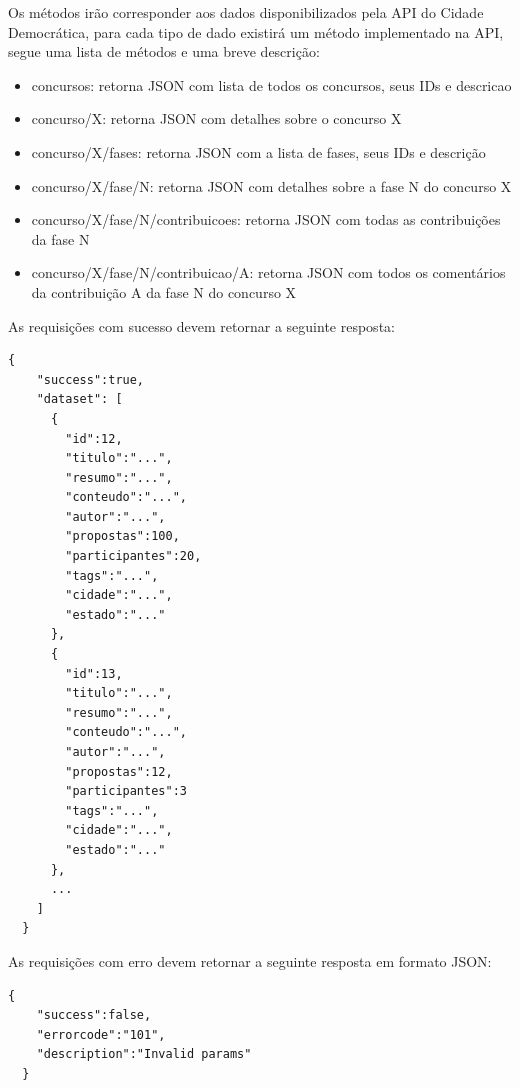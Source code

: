 \documentclass[12pt]{article}
\begin{document}
Os métodos irão corresponder aos dados disponibilizados pela API do Cidade
Democrática, para cada tipo de dado existirá um método implementado na API,
segue uma lista de métodos e uma breve descrição:

\begin{itemize}
  \item concursos: retorna JSON com lista de todos os concursos, seus IDs e descricao
  \item concurso/X: retorna JSON com detalhes sobre o concurso X
  \item concurso/X/fases: retorna JSON com a lista de fases, seus IDs e descrição
  \item concurso/X/fase/N: retorna JSON com detalhes sobre a fase N do concurso X
  \item concurso/X/fase/N/contribuicoes: retorna JSON com todas as contribuições da fase N
  \item concurso/X/fase/N/contribuicao/A: retorna JSON com todos os comentários da contribuição A da fase N do concurso X
\end{itemize}

As requisições com sucesso devem retornar a seguinte resposta:

\begin{framed}
\begin{lstlisting}[caption=Exemplo de retorno JSON com a lista de todos os concursos]
  {
    "success":true,
    "dataset": [
      {
        "id":12,
        "titulo":"...",
        "resumo":"...",
        "conteudo":"...",
        "autor":"...",
        "propostas":100,
        "participantes":20,
        "tags":"...",
        "cidade":"...",
        "estado":"..."
      },
      {
        "id":13,
        "titulo":"...",
        "resumo":"...",
        "conteudo":"...",
        "autor":"...",
        "propostas":12,
        "participantes":3
        "tags":"...",
        "cidade":"...",
        "estado":"..."
      },
      ...
    ]
  }
\end{lstlisting}
\end{framed}

As requisições com erro devem retornar a seguinte resposta em formato JSON:

\begin{framed}
\begin{lstlisting}[caption=Exemplo de retorno JSON com erro]
  {
    "success":false,
    "errorcode":"101",
    "description":"Invalid params"
  }
\end{lstlisting}
\end{framed}
\end{document}
